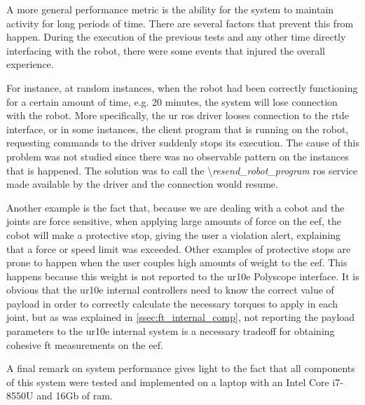 \par A more general performance metric is the ability for the system to maintain activity for long periods of time. There are several factors that prevent this from happen. During the execution of the previous tests and any other time directly interfacing with the robot, there were some events that injured the overall experience.

\par For instance, at random instances, when the robot had been correctly functioning for a certain amount of time, e.g. 20 minutes, the system will lose connection with the robot. More specifically, the \ac{ur} \ac{ros} driver looses connection to the \ac{rtde} interface, or in some instances, the client program that is running on the robot, requesting commands to the driver suddenly stops its execution. The cause of this problem was not studied since there was no observable pattern on the instances that is happened. The solution was to call the \textbackslash\textit{resend\_robot\_program} \ac{ros} service made available by the driver and the connection would resume.

\par Another example is the fact that, because we are dealing with a cobot and the joints are force sensitive, when applying large amounts of force on the \ac{eef}, the cobot will make a protective stop, giving the user a violation alert, explaining that a force or speed limit was exceeded. Other examples of protective stops are prone to happen when the user couples high amounts of weight to the \ac{eef}. This happens because this weight is not reported to the \ac{ur10e} Polyscope interface. It is obvious that the \ac{ur10e} internal controllers need to know the correct value of payload in order to correctly calculate the necessary torques to apply in each joint, but as was explained in \autoref{ssec:ft_internal_comp}, not reporting the payload parameters to the \ac{ur10e} internal system is a necessary tradeoff for obtaining cohesive \ac{ft} measurements on the \ac{eef}.

\par A final remark on system performance gives light to the fact that all components of this system were tested and implemented on a laptop with an Intel Core i7-8550U and 16Gb of \acs{ram}. 